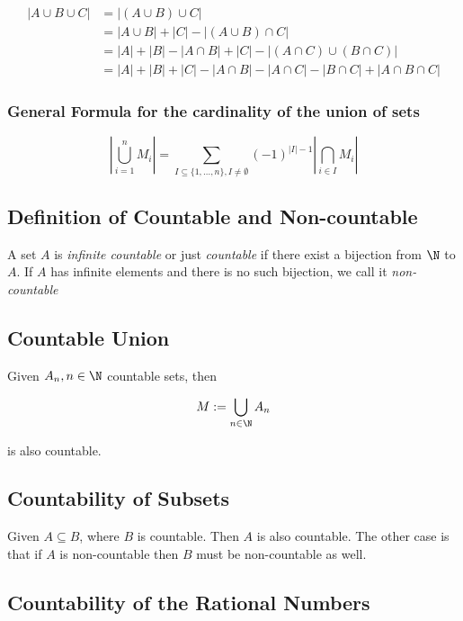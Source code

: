 \begin{align*}
	|A \cup B \cup C| &= |(A \cup B) \cup C| \\ 
	&= |A \cup B| + |C| - |(A \cup B) \cap C| \\
 	&= |A| + |B| - |A \cap B| + |C| - |(A \cap C) \cup (B \cap C)|\\
	&= |A| + |B| + |C| - |A \cap B| - |A \cap C| - |B \cap C| + |A \cap B \cap C|
\end{align*}

\subsubsection{General Formula for the cardinality of the union of sets}

\[
	\left\vert \bigcup_{i = 1}^n M_i \right\vert  = \sum_{I \subseteq \{1, \dots, n\}, I \neq \emptyset}
	{(-1)}^{|I| - 1} \left\vert \bigcap_{i \in I} M_i \right\vert
\]

\subsection{Definition of Countable and Non-countable}

A set \(A\) is \emph{infinite countable} or just \emph{countable} if there exist a bijection from \(\N\) to 
\(A\). If \(A\) has infinite elements and there is no such bijection, we call it \emph{non-countable}

\subsection{Countable Union}

Given \(A_n, n \in \N\) countable sets, then 

\[
	M := \bigcup_{n \in \N} A_n 
\]

is also countable.

\subsection{Countability of Subsets}

Given \(A \subseteq B\), where \(B\) is countable. Then \(A\) is also countable. The other case is 
that if \(A\) is non-countable then \(B\) must be non-countable as well.

\subsection{Countability of the Rational Numbers}

